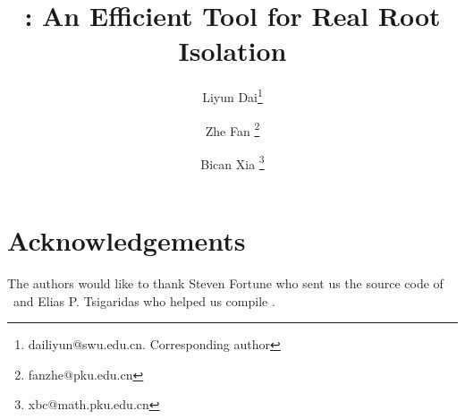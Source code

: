 \documentclass[10pt,a4paper]{article}
\begin{document}
	
	\title{\froot: An Efficient Tool for Real Root Isolation}
		
		\author[1]{Liyun Dai\thanks{dailiyun@swu.edu.cn. Corresponding author}	}
		\author[2]{Zhe Fan \thanks{fanzhe@pku.edu.cn}}
		\author[2]{Bican Xia \thanks{xbc@math.pku.edu.cn}}
	
	
	\renewcommand\Authands{ and }
\date{}
\maketitle















%
%


\section*{Acknowledgements}
The authors would like to thank Steven Fortune who sent us the source code of \eign\ and Elias P. Tsigaridas who helped us compile \cf.





\end{document}
